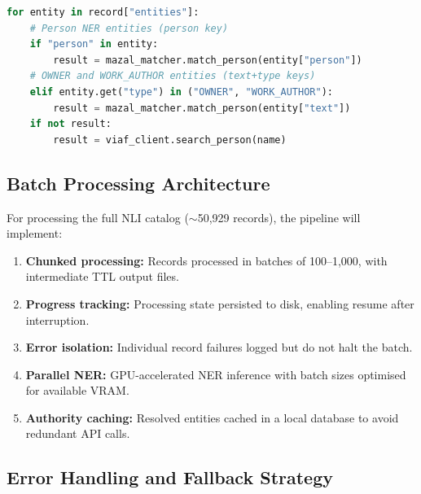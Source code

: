 \documentclass[12pt]{article}
\begin{document}
\begin{lstlisting}[language=Python, caption={Authority resolution for NER-extracted entities (implemented)}]
for entity in record["entities"]:
    # Person NER entities (person key)
    if "person" in entity:
        result = mazal_matcher.match_person(entity["person"])
    # OWNER and WORK_AUTHOR entities (text+type keys)
    elif entity.get("type") in ("OWNER", "WORK_AUTHOR"):
        result = mazal_matcher.match_person(entity["text"])
    if not result:
        result = viaf_client.search_person(name)
\end{lstlisting}

\subsection{Batch Processing Architecture}

For processing the full NLI catalog ($\sim$50,929 records), the pipeline will implement:

\begin{enumerate}
\item \textbf{Chunked processing:} Records processed in batches of 100--1,000, with intermediate TTL output files.
\item \textbf{Progress tracking:} Processing state persisted to disk, enabling resume after interruption.
\item \textbf{Error isolation:} Individual record failures logged but do not halt the batch.
\item \textbf{Parallel NER:} GPU-accelerated NER inference with batch sizes optimised for available VRAM.
\item \textbf{Authority caching:} Resolved entities cached in a local database to avoid redundant API calls.
\end{enumerate}

\subsection{Error Handling and Fallback Strategy}
\end{document}
